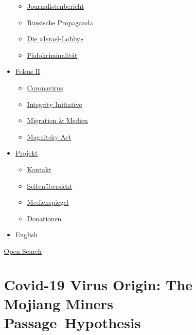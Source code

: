 \begin{itemize}
  \begin{itemize}
  \tightlist
  \item
    \href{https://swprs.org/bericht-eines-journalisten/}{Journalistenbericht}
  \item
    \href{https://swprs.org/russische-propaganda/}{Russische Propaganda}
  \item
    \href{https://swprs.org/die-israel-lobby-fakten-und-mythen/}{Die
    »Israel-Lobby«}
  \item
    \href{https://swprs.org/geopolitik-und-paedokriminalitaet/}{Pädokriminalität}
  \end{itemize}
\item
  \href{https://swprs.org/migration-und-medien/}{Fokus II}

  \begin{itemize}
  \tightlist
  \item
    \href{https://swprs.org/covid-19-hinweis-ii/}{Coronavirus}
  \item
    \href{https://swprs.org/die-integrity-initiative/}{Integrity
    Initiative}
  \item
    \href{https://swprs.org/migration-und-medien/}{Migration \& Medien}
  \item
    \href{https://swprs.org/der-fall-magnitsky/}{Magnitsky Act}
  \end{itemize}
\item
  \href{https://swprs.org/kontakt/}{Projekt}

  \begin{itemize}
  \tightlist
  \item
    \href{https://swprs.org/kontakt/}{Kontakt}
  \item
    \href{https://swprs.org/uebersicht/}{Seitenübersicht}
  \item
    \href{https://swprs.org/medienspiegel/}{Medienspiegel}
  \item
    \href{https://swprs.org/donationen/}{Donationen}
  \end{itemize}
\item
  \href{https://swprs.org/contact/}{English}
\end{itemize}

\protect\hyperlink{}{Open Search}

\hypertarget{covid-19-virus-origin-the-mojiang-miners-passage-hypothesis}{%
\section{Covid-19 Virus Origin: The Mojiang Miners
Passage~Hypothesis}\label{covid-19-virus-origin-the-mojiang-miners-passage-hypothesis}}

